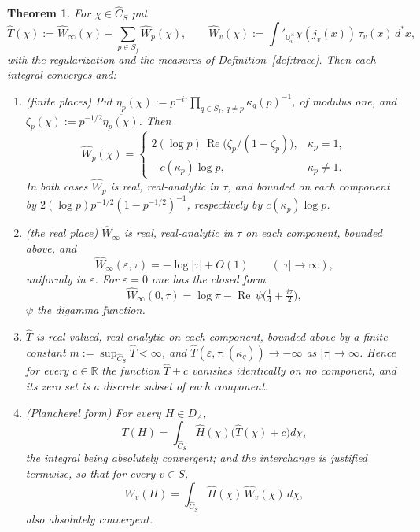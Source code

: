 \documentclass[11pt]{amsart}
\newtheorem{theorem}{Theorem}[section]
\theoremstyle{definition}
\theoremstyle{remark}
\newcommand{\R}{\mathbb R}
\newcommand{\Q}{\mathbb Q}
\newcommand{\dstar}{\,d^{*}}
\newcommand{\Rel}{\operatorname{Re}}
\newcommand{\Th}{\widehat{T}}
\newcommand{\Wh}{\widehat{W}}
\newcommand{\Ch}{\widehat{C}_S}
\newcommand{\DA}{D_A}
\begin{document}
\begin{theorem}\label{thm:symbol}
For $\chi\in\Ch$ put
\begin{equation}\label{eq:symboldef}
\Th(\chi):=\Wh_{\infty}(\chi)+\sum_{p\in S_f}\Wh_p(\chi),\qquad
\Wh_v(\chi):=\int'_{\Q_v^{\times}}\chi(j_v(x))\,\tau_v(x)\dstar x,
\end{equation}
with the regularization and the measures of Definition~\ref{def:trace}.  Then
each integral converges and:
\begin{enumerate}
\item[(a)] \emph{(finite places)}  Put
$\eta_p(\chi):=p^{-i\tau}\prod_{q\in S_f,\,q\ne p}\kappa_q(p)^{-1}$, of modulus
one, and $\zeta_p(\chi):=p^{-1/2}\overline{\eta_p(\chi)}$.  Then
\begin{equation}\label{eq:Wphat}
\Wh_p(\chi)=
\begin{cases}
2(\log p)\,\Rel\bigl(\zeta_p/(1-\zeta_p)\bigr), & \kappa_p=1,\\[2pt]
-c(\kappa_p)\log p, & \kappa_p\neq1 .
\end{cases}
\end{equation}
In both cases $\Wh_p$ is real, real-analytic in $\tau$, and bounded on each
component by $2(\log p)p^{-1/2}(1-p^{-1/2})^{-1}$, respectively by
$c(\kappa_p)\log p$.
\item[(b)] \emph{(the real place)}  $\Wh_{\infty}$ is real, real-analytic in
$\tau$ on each component, bounded above, and
\begin{equation}\label{eq:Winfhat}
\Wh_{\infty}(\varepsilon,\tau)=-\log|\tau|+O(1)\qquad(|\tau|\to\infty),
\end{equation}
uniformly in $\varepsilon$.  For $\varepsilon=0$ one has the closed form
\begin{equation}\label{eq:Winfclosed}
\Wh_{\infty}(0,\tau)=\log\pi-\Rel\,\psi\bigl(\tfrac14+\tfrac{i\tau}{2}\bigr),
\end{equation}
$\psi$ the digamma function.
\item[(c)] $\Th$ is real-valued, real-analytic on each component, bounded above
by a finite constant $m:=\sup_{\Ch}\Th<\infty$, and
$\Th(\varepsilon,\tau;(\kappa_q))\to-\infty$ as $|\tau|\to\infty$.  Hence for
every $c\in\R$ the function $\Th+c$ vanishes identically on no component, and
its zero set is a discrete subset of each component.
\item[(d)] \emph{(Plancherel form)}  For every $H\in\DA$,
\begin{equation}\label{eq:plancherel}
T(H)=\int_{\Ch}\widehat H(\chi)\bigl(\Th(\chi)+c\bigr)d\chi ,
\end{equation}
the integral being absolutely convergent; and the interchange is justified
termwise, so that for every $v\in S$,
\begin{equation}\label{eq:plancherelv}
W_v(H)=\int_{\Ch}\widehat H(\chi)\,\Wh_v(\chi)\,d\chi ,
\end{equation}
also absolutely convergent.
\end{enumerate}
\end{theorem}
\end{document}
